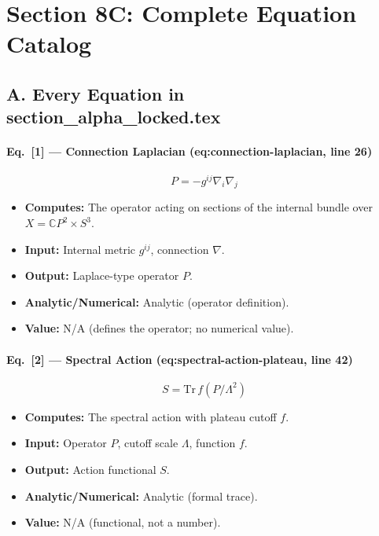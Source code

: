 
\section*{Section 8C: Complete Equation Catalog}

\subsection*{A. Every Equation in section\_alpha\_locked.tex}


\paragraph{Eq.\ [1] --- Connection Laplacian (eq:connection-laplacian, line 26)}
\[
  P = -g^{ij}\nabla_i\nabla_j
\]
\begin{itemize}
  \item \textbf{Computes:} The operator acting on sections of the internal bundle
        over $X = \mathbb{C}P^2 \times S^3$.
  \item \textbf{Input:} Internal metric $g^{ij}$, connection $\nabla$.
  \item \textbf{Output:} Laplace-type operator $P$.
  \item \textbf{Analytic/Numerical:} Analytic (operator definition).
  \item \textbf{Value:} N/A (defines the operator; no numerical value).
\end{itemize}

\paragraph{Eq.\ [2] --- Spectral Action (eq:spectral-action-plateau, line 42)}
\[
  S = \mathrm{Tr}\, f(P/\Lambda^2)
\]
\begin{itemize}
  \item \textbf{Computes:} The spectral action with plateau cutoff $f$.
  \item \textbf{Input:} Operator $P$, cutoff scale $\Lambda$, function $f$.
  \item \textbf{Output:} Action functional $S$.
  \item \textbf{Analytic/Numerical:} Analytic (formal trace).
  \item \textbf{Value:} N/A (functional, not a number).
\end{itemize}

